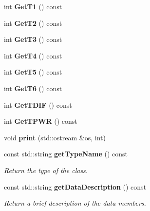\begin{DoxyCompactItemize}
\item 
int {\bfseries GetT1} () const \label{classCALICE_1_1TempSensorBlock2_aec4184305621faf41a9ad39a0b70eb34}

\item 
int {\bfseries GetT2} () const \label{classCALICE_1_1TempSensorBlock2_a910deb622a4882de3c245cdd74a792ed}

\item 
int {\bfseries GetT3} () const \label{classCALICE_1_1TempSensorBlock2_abec6d13fe16bb8e9afabbd7eabdc0dbc}

\item 
int {\bfseries GetT4} () const \label{classCALICE_1_1TempSensorBlock2_a8689abf3279957fe644cf450ee08ddc8}

\item 
int {\bfseries GetT5} () const \label{classCALICE_1_1TempSensorBlock2_a9f6702c33d6e3813b1d2b24b918d8d82}

\item 
int {\bfseries GetT6} () const \label{classCALICE_1_1TempSensorBlock2_a54d82a9b7521b8d9483ee600c1ad375f}

\item 
int {\bfseries GetTDIF} () const \label{classCALICE_1_1TempSensorBlock2_a833e1b88513124ae5370c2777dfa0bdd}

\item 
int {\bfseries GetTPWR} () const \label{classCALICE_1_1TempSensorBlock2_a9120824274d48a1a77218219de1139da}

\item 
void {\bfseries print} (std::ostream \&os, int)\label{classCALICE_1_1TempSensorBlock2_a18fcad9b01f87d568216df1198423cff}

\item 
const std::string {\bf getTypeName} () const \label{classCALICE_1_1TempSensorBlock2_aa7c390c29411439dbd83bd24f639570d}

\begin{DoxyCompactList}\small\item\em Return the type of the class. \item\end{DoxyCompactList}\item 
const std::string {\bf getDataDescription} () const \label{classCALICE_1_1TempSensorBlock2_a876ddbe948463b85208e29cc03fc894b}

\begin{DoxyCompactList}\small\item\em Return a brief description of the data members. \item\end{DoxyCompactList}\end{DoxyCompactItemize}


